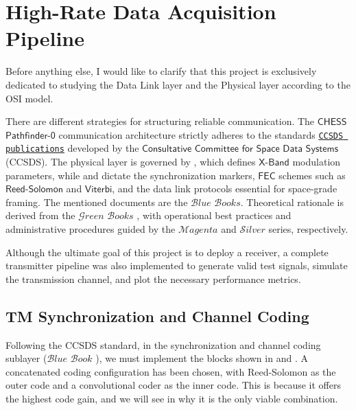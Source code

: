 \chapter{High-Rate Data Acquisition Pipeline} \label{ch:Pipeline}

Before anything else, I would like to clarify that this project is exclusively dedicated to studying the Data Link layer and the Physical layer according to the \textsf{OSI} model.

There are different strategies for structuring reliable communication. The \(\mathsf{CHESS}\) \(\mathsf{Pathfinder\text{-}0}\) communication architecture strictly adheres to the standards \href{https://ccsds.org/publications/}{\texttt{CCSDS publications}} developed by the \(\mathsf{Consultative}\) \(\mathsf{Committee}\) \(\mathsf{for}\) \(\mathsf{Space}\) \(\mathsf{Data}\) \(\mathsf{Systems}\) (CCSDS). The physical layer is governed by \autocite{CCSDS_401_0_B_32}, which defines \(\mathsf{X\text{-}Band}\) modulation parameters, while \autocite{CCSDS_131_0_B_5} and \autocite{CCSDS_132_0_B_3} dictate the synchronization markers, \(\mathsf{FEC}\) schemes such as \(\mathsf{Reed\text{-}Solomon}\) and \(\mathsf{Viterbi}\), and the data link protocols essential for space-grade framing. The mentioned documents are the \(\mathcal{B}lue\) \(\mathcal{B}ooks\). Theoretical rationale is derived from the \(\mathcal{G}reen\) \(\mathcal{B}ooks\) \autocite{CCSDS_130_1_G_3}, with operational best practices and administrative procedures guided by the \(\mathcal{M}agenta\) and \(\mathcal{S}ilver\) series, respectively.

Although the ultimate goal of this project is to deploy a receiver, a complete transmitter pipeline was also implemented to generate valid test signals, simulate the transmission channel, and plot the necessary performance metrics.

\section{TM Synchronization and Channel Coding} \label{sec:tm_sync_coding}

Following the CCSDS standard, in the synchronization and channel coding sublayer ($\mathcal{B}lue$ $\mathcal{B}ook$ \autocite{CCSDS_131_0_B_5}), we must implement the blocks shown in  and . A concatenated coding configuration has been chosen, with Reed-Solomon as the outer code and a convolutional coder as the inner code. This is because it offers the highest code gain, and we will see in  why it is the only viable combination.

